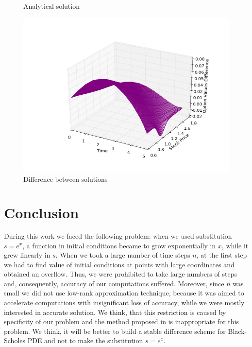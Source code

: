 \documentclass[11pt,a4paper]{extarticle}
\begin{document}
\begin{minipage}{\linewidth}
\begin{minipage}{0.29\linewidth}
\begin{figure}[H]
              \caption{Analytical solution}
          \end{figure}
      \end{minipage}
      \hspace{0.04\linewidth}
      \begin{minipage}{0.29\linewidth}
          \begin{figure}[H]
              \includegraphics[width=\linewidth]{Figures/a-o-n-put-dif}
              \caption{Difference between solutions}
          \end{figure}
      \end{minipage}
\end{minipage}

\section{Conclusion}

During this work we faced the following problem: when we used substitution $s = e^x$, a function in initial conditions became to grow exponentially in $x$, while it grew linearly in $s$.
When we took a large number of time steps $n$, at the first step we had to find value of initial conditions at points with large coordinates and obtained an overflow.
Thus, we were prohibited to take large numbers of steps and, consequently, accuracy of our computations suffered.
Moreover, since $n$ was small we did not use low-rank approximation technique, because it was aimed to accelerate computations with insignificant loss of accuracy, while we were mostly interested in accurate solution.
We think, that this restriction is caused by specificity of our problem and the method proposed in \cite{oseledets} is inappropriate for this problem.
We think, it will be better to build a stable difference scheme for Black-Scholes PDE and not to make the substitution $s = e^x$.
\end{document}
